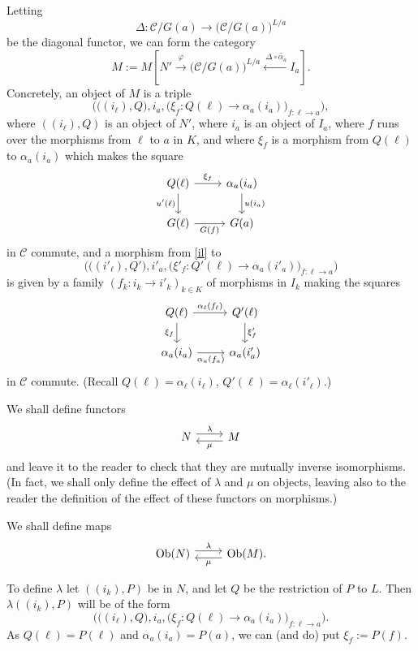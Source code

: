 \documentclass[12pt]{article}
\theoremstyle{remark}
\theoremstyle{definition}
\newcommand{\C}{\mathcal C}
\newcommand{\pp}{\varphi}
\DeclareMathOperator{\Ob}{Ob}
\begin{document}
Letting 
$$
\Delta:\C/G(a)\to\big(\C/G(a)\big)^{L/a}
$$ 
be the diagonal functor, we can form the category 
$$
M:=M\left[N'\xrightarrow{\pp}\big(\C/G(a)\big)^{L/a}\xleftarrow{\ \Delta\circ\widetilde{\alpha_a}}I_a\right].
$$ 
Concretely, an object of $M$ is a triple 
%
\begin{equation}\label{il}
\Big(\big((i_\ell),Q\big),i_a,\big(\xi_f:Q(\ell)\to\alpha_a(i_a)\big)_{f:\ell\to a}\Big),
\end{equation}
%  
where $((i_\ell),Q)$ is an object of $N'$, where $i_a$ is an object of $I_a$, where $f$ runs over the morphisms from $\ell$ to $a$ in $K$, and where $\xi_f$ is a morphism from $Q(\ell)$ to $\alpha_a(i_a)$ which makes the square  
$$
\begin{tikzcd}
Q(\ell)\ar{r}{\xi_f}\ar{d}[swap]{u'(\ell)}&\alpha_a(i_a)\ar{d}{u(i_a)}\\ 
G(\ell)\ar{r}[swap]{G(f)}&G(a) 
\end{tikzcd}
$$ 
in $\C$ commute, and a morphism from \eqref{il} to 
$$
\Big(\big((i'_\ell),Q'\big),i'_a,\big(\xi'_f:Q'(\ell)\to\alpha_a(i'_a)\big)_{f:\ell\to a}\Big)
$$ 
is given by a family $(f_k:i_k\to i'_k)_{k\in K}$ of morphisms in $I_k$ making the squares 
$$
\begin{tikzcd}
Q(\ell)\ar{r}{\alpha_\ell(f_\ell)}\ar{d}[swap]{\xi_f}&Q'(\ell)\ar{d}{\xi'_f}\\ 
\alpha_a(i_a)\ar{r}[swap]{\alpha_a(f_a)}&\alpha_a(i'_a) 
\end{tikzcd}
$$ 
in $\C$ commute. (Recall $Q(\ell)=\alpha_\ell(i_\ell)$, $Q'(\ell)=\alpha_\ell(i'_\ell)$.)

We shall define functors 
$$
\begin{tikzcd}
N\ar[yshift=0.7ex]{r}{\lambda}&M\ar[yshift=-0.7ex]{l}{\mu}
\end{tikzcd}
$$ 
and leave it to the reader to check that they are mutually inverse isomorphisms. (In fact, we shall only define the effect of $\lambda$ and $\mu$ on objects, leaving also to the reader the definition of the effect of these functors on morphisms.)

We shall define maps 
$$
\begin{tikzcd}
\Ob(N)\ar[yshift=0.7ex]{r}{\lambda}&\Ob(M).\ar[yshift=-0.7ex]{l}{\mu}
\end{tikzcd}
$$ 

To define $\lambda$ let $((i_k),P)$ be in $N$, and let $Q$ be the restriction of $P$ to $L$. Then $\lambda((i_k),P)$ will be of the form 
$$
\Big(\big((i_\ell),Q\big),i_a,\big(\xi_f:Q(\ell)\to\alpha_a(i_a)\big)_{f:\ell\to a}\Big).
$$ 
As $Q(\ell)=P(\ell)$ and $\alpha_a(i_a)=P(a)$, we can (and do) put $\xi_f:=P(f)$. 
\end{document}

